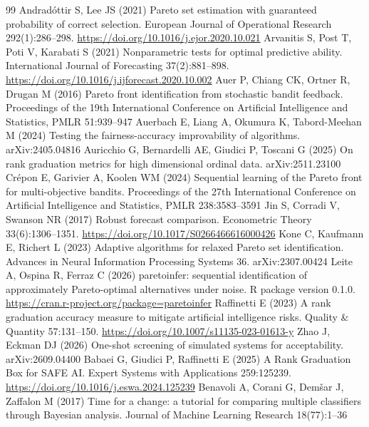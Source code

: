 \documentclass[pdflatex,sn-mathphys-num,iicol]{sn-jnl}
\theoremstyle{thmstyleone}
\theoremstyle{thmstyletwo}
\begin{document}
\begin{thebibliography}{99}
 Andrad{\'o}ttir S, Lee JS (2021) Pareto set estimation with guaranteed probability of correct selection. European Journal of Operational Research 292(1):286--298. \url{https://doi.org/10.1016/j.ejor.2020.10.021}
 Arvanitis S, Post T, Poti V, Karabati S (2021) Nonparametric tests for optimal predictive ability. International Journal of Forecasting 37(2):881--898. \url{https://doi.org/10.1016/j.ijforecast.2020.10.002}
 Auer P, Chiang CK, Ortner R, Drugan M (2016) Pareto front identification from stochastic bandit feedback. Proceedings of the 19th International Conference on Artificial Intelligence and Statistics, PMLR 51:939--947
 Auerbach E, Liang A, Okumura K, Tabord-Meehan M (2024) Testing the fairness-accuracy improvability of algorithms. arXiv:2405.04816
 Auricchio G, Bernardelli AE, Giudici P, Toscani G (2025) On rank graduation metrics for high dimensional ordinal data. arXiv:2511.23100
 Cr{\'e}pon E, Garivier A, Koolen WM (2024) Sequential learning of the Pareto front for multi-objective bandits. Proceedings of the 27th International Conference on Artificial Intelligence and Statistics, PMLR 238:3583--3591
 Jin S, Corradi V, Swanson NR (2017) Robust forecast comparison. Econometric Theory 33(6):1306--1351. \url{https://doi.org/10.1017/S0266466616000426}
 Kone C, Kaufmann E, Richert L (2023) Adaptive algorithms for relaxed Pareto set identification. Advances in Neural Information Processing Systems 36. arXiv:2307.00424
 Leite A, Ospina R, Ferraz C (2026) paretoinfer: sequential identification of approximately Pareto-optimal alternatives under noise. R package version 0.1.0. \url{https://cran.r-project.org/package=paretoinfer}
 Raffinetti E (2023) A rank graduation accuracy measure to mitigate artificial intelligence risks. Quality \& Quantity 57:131--150. \url{https://doi.org/10.1007/s11135-023-01613-y}
 Zhao J, Eckman DJ (2026) One-shot screening of simulated systems for acceptability. arXiv:2609.04400
 Babaei G, Giudici P, Raffinetti E (2025) A Rank Graduation Box for SAFE AI. Expert Systems with Applications 259:125239. \url{https://doi.org/10.1016/j.eswa.2024.125239}
 Benavoli A, Corani G, Dem{\v s}ar J, Zaffalon M (2017) Time for a change: a tutorial for comparing multiple classifiers through Bayesian analysis. Journal of Machine Learning Research 18(77):1--36

\end{thebibliography}
\end{document}

